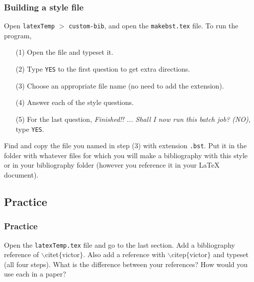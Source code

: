 \begin{frame}  \frametitle{Building a style file}
Open \texttt{latexTemp} $>$ \texttt{custom-bib}, and open the \texttt{\color{highlight}makebst.tex} file. To run the program,
\begin{itemize}
\item[(1)] Open the file and typeset it.
\item[(2)] Type \texttt{YES} to the first question to get extra directions.
\item[(3)] Choose an appropriate file name (no need to add the extension).
\item[(4)] Answer each of the style questions.
\item[(5)] For the last question, \textit{Finished!! ...  Shall I now run this batch job? (NO)}, type \texttt{YES}.
\end{itemize}
Find and copy the file you named in step (3) with extension \texttt{.bst}. Put it in the folder with whatever files for which you will make a bibliography with this style or in your bibliography folder (however you reference it in your LaTeX document).
\end{frame}

\subsection{Practice}

\begin{frame}  \frametitle{Practice}
Open the \texttt{\color{highlight}latexTemp.tex} file and go to the last section. Add a bibliography reference of {\color{command}$\backslash$citet}{\color{braces}$\{${\color{black}victor}$\}$}. Also add a reference with {\color{command}$\backslash$citep}{\color{braces}$\{${\color{black}victor}$\}$} and typeset (all four steps). What is the difference between your references? How would you use each in a paper?\end{frame}




